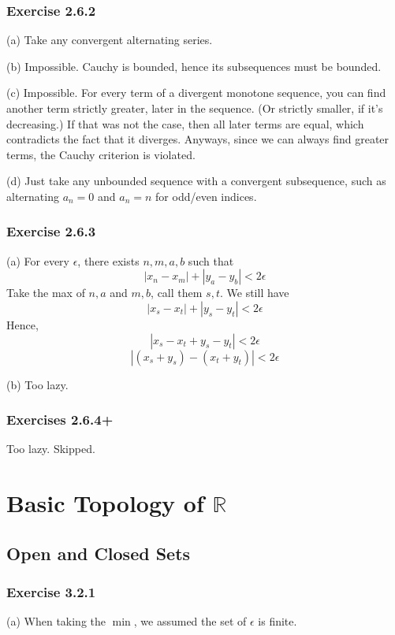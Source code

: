 \documentclass{book}
\begin{document}
\subsection*{Exercise 2.6.2}
(a)
Take any convergent alternating series.

\noindent
(b)
Impossible. Cauchy is bounded, hence its subsequences must be bounded.

\noindent
(c)
Impossible. For every term of a divergent monotone sequence, you can find another term strictly greater, later in the sequence. (Or strictly smaller, if it's decreasing.) If that was not the case, then all later terms are equal, which contradicts the fact that it diverges. Anyways, since we can always find greater terms, the Cauchy criterion is violated.

\noindent
(d)
Just take any unbounded sequence with a convergent subsequence, such as alternating $a_n = 0$ and $a_n = n$ for odd/even indices.

\subsection*{Exercise 2.6.3}
(a)
For every $\epsilon$, there exists $n, m, a, b$ such that
$$|x_n - x_m| + |y_a - y_b| < 2\epsilon$$
Take the max of $n, a$ and $m, b$, call them $s, t$. We still have
$$|x_s - x_t| + |y_s - y_t| < 2\epsilon$$
Hence,
$$|x_s - x_t + y_s - y_t| < 2\epsilon$$
$$|(x_s + y_s) - (x_t + y_t)| < 2\epsilon$$

\noindent
(b)
Too lazy.

\subsection*{Exercises 2.6.4+}
Too lazy. Skipped.

\chapter{Basic Topology of $\mathbb{R}$}

\section{}
\section{Open and Closed Sets}

\subsection*{Exercise 3.2.1}
(a)
When taking the $\min$, we assumed the set of $\epsilon$ is finite.
\end{document}
